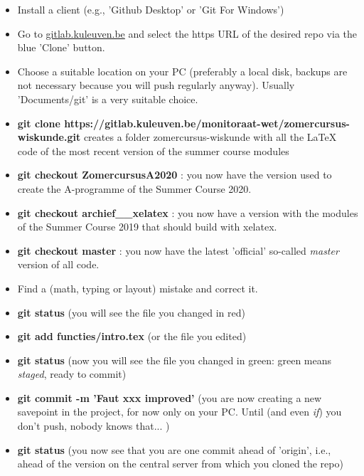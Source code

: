 \documentclass{ximera}
\begin{document}
\begin{itemize}
\item Install a client (e.g., 'Github Desktop' or 'Git For Windows')
\item Go to \url{gitlab.kuleuven.be} and select the https URL of the desired repo via the blue 'Clone' button.
\item Choose a suitable location on your PC (preferably a local disk, backups are not necessary because you will push regularly anyway). Usually 'Documents/git' is a very suitable choice.
\item \textbf{ git clone https://gitlab.kuleuven.be/monitoraat-wet/zomercursus-wiskunde.git} creates a folder zomercursus-wiskunde with all the LaTeX code of the most recent version of the summer course modules

\item \textbf{git checkout ZomercursusA2020} : you now have the version used to create the A-programme of the Summer Course 2020.

\item \textbf{git checkout archief\_\_xelatex} : you now have a version with the modules of the Summer Course 2019 that should build with xelatex.

\item \textbf{git checkout master} : you now have the latest 'official' so-called \textit{master} version of all code.

\item Find a (math, typing or layout) mistake and correct it.

\item \textbf{git status} (you will see the file you changed in red)

\item \textbf{git add functies/intro.tex} (or the file you edited)

\item \textbf{git status} (now you will see the file you changed in green: green means \textit{staged}, ready to commit)

\item \textbf{git commit -m 'Faut xxx improved'} (you are now creating a new savepoint in the project, for now only on your PC. Until (and even \textit{if}) you don't push, nobody knows that... )

\item \textbf{git status} (you now see that you are one commit ahead of 'origin', i.e., ahead of the version on the central server from which you cloned the repo)


\end{itemize}
\end{document}
